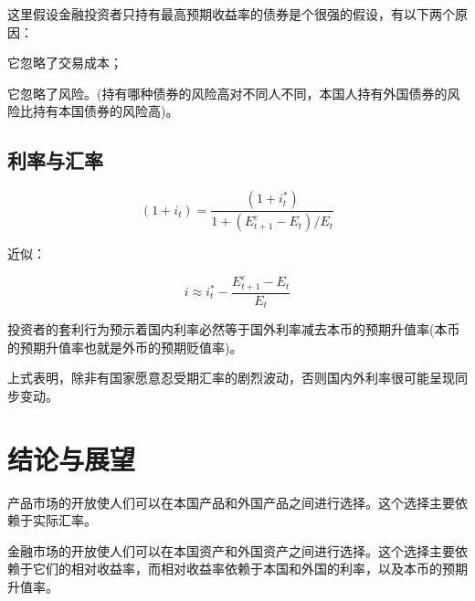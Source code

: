 \documentclass{article}
\begin{document}
\hspace*{\fill}

这里假设金融投资者只持有最高预期收益率的债券是个很强的假设，有以下两个原因：

它忽略了交易成本；

它忽略了风险。(持有哪种债券的风险高对不同人不同，本国人持有外国债券的风险比持有本国债券的风险高)。

\subsection{利率与汇率}

\[
(1+i_t)=\frac{(1+i^*_t)}{1+(E^e_{t+1}-E_t)/E_t}
\]

近似：

\[
i\approx i^*_t-\frac{E^e_{t+1}-E_t}{E_t}
\]


投资者的套利行为预示着国内利率必然等于国外利率减去本币的预期升值率(本币的预期升值率也就是外币的预期贬值率)。


上式表明，除非有国家愿意忍受期汇率的剧烈波动，否则国内外利率很可能呈现同步变动。

\section{结论与展望}

产品市场的开放使人们可以在本国产品和外国产品之间进行选择。这个选择主要依赖于实际汇率。

金融市场的开放使人们可以在本国资产和外国资产之间进行选择。这个选择主要依赖于它们的相对收益率，而相对收益率依赖于本国和外国的利率，以及本币的预期升值率。
\end{document}
